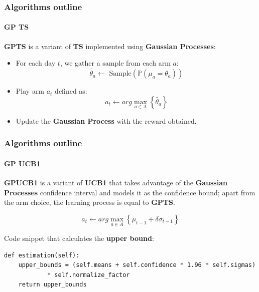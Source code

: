 \begin{frame}

\frametitle{Algorithms outline}
\framesubtitle{GP TS}

\textbf{GPTS} is a variant of \textbf{TS} implemented using \textbf{Gaussian Processes}:

\begin{itemize}[label={$\circ$}]
	\item For each day $t$, we gather a sample from each arm $a$:
		\begin{displaymath}
			\tilde{\theta_a} \leftarrow \text{ Sample} \left( \mathbb{P}(\mu_a = \theta_a) \right)
		\end{displaymath}
	\item Play arm $a_t$ defined as:
		\begin{displaymath}
			a_t \leftarrow arg\max_{a \in A} \left\{ \tilde{\theta_a} \right\}
		\end{displaymath}
	\item Update the \textbf{Gaussian Process} with the reward obtained.
\end{itemize}

\end{frame}


\begin{frame}[fragile]

\frametitle{Algorithms outline}
\framesubtitle{GP UCB1}

\textbf{GPUCB1} is a variant of \textbf{UCB1} that takes advantage of the \textbf{Gaussian Processes} confidence interval and models it as the confidence bound; apart from the arm choice, the learning process is equal to \textbf{GPTS}.

\begin{displaymath}
	a_t \leftarrow arg\max_{a \in A} \left\{ \mu_{t-1} + \delta \sigma_{t-1} \right\}
\end{displaymath}

Code snippet that calculates the \textbf{upper bound}:

\begin{lstlisting}[style=Python, basicstyle=\tiny, numbers=none, xrightmargin=15px]
def estimation(self):
	upper_bounds = (self.means + self.confidence * 1.96 * self.sigmas)
			* self.normalize_factor
	return upper_bounds
\end{lstlisting}

\end{frame}

